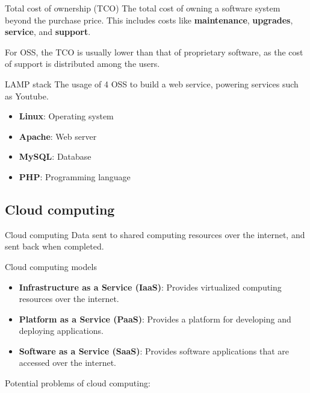 \begin{definition}
    {Total cost of ownership (TCO)}
    The total cost of owning a software system beyond the purchase price. This includes costs like \textbf{maintenance}, \textbf{upgrades}, \textbf{service}, and \textbf{support}.

    For OSS, the TCO is usually lower than that of proprietary software, as the cost of support is distributed among the users.
\end{definition}

\begin{definition}
    {LAMP stack}
    The usage of 4 OSS to build a web service, powering services such as Youtube.
    \begin{itemize}
        \item \textbf{Linux}: Operating system
        \item \textbf{Apache}: Web server
        \item \textbf{MySQL}: Database
        \item \textbf{PHP}: Programming language
    \end{itemize}
\end{definition}

\subsection{Cloud computing}

\begin{definition}
    {Cloud computing}
    Data sent to shared computing resources over the internet, and sent back when completed.
\end{definition}

\begin{theorem}
    {Cloud computing models}
    \begin{itemize}
        \item \textbf{Infrastructure as a Service (IaaS)}: Provides virtualized computing resources over the internet.
        \item \textbf{Platform as a Service (PaaS)}: Provides a platform for developing and deploying applications.
        \item \textbf{Software as a Service (SaaS)}: Provides software applications that are accessed over the internet.
    \end{itemize}
\end{theorem}

Potential problems of cloud computing:

